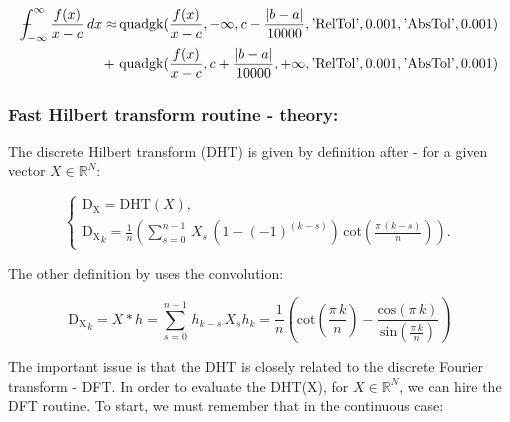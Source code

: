 \documentclass[12pt,twoside,a4paper]{article}
\numberwithin{equation}{subsection}
\numberwithin{figure}{subsection}
\def\Xint#1{\mathchoice
{\XXint\displaystyle\textstyle{#1}}%
{\XXint\textstyle\scriptstyle{#1}}%
{\XXint\scriptstyle\scriptscriptstyle{#1}}%
{\XXint\scriptscriptstyle\scriptscriptstyle{#1}}%
\!\int}
\def\XXint#1#2#3{{\setbox0=\hbox{$#1{#2#3}{\int}$ }\vcenter{\hbox{$#2#3$ }}\kern-.6\wd0}}
\def\dashint{\Xint-}
\begin{document}
\begin{alignat}{1} \label{eq:mat_quadadd}
  \dashint_{ - \infty }^{\infty } \frac {f(x)}{x-c} \, dx \approx 
          & \, \mathrm{quadgk}(\frac {f(x)}{x-c}, - \infty, c - \frac{|b-a|}{10000}, \text{'RelTol'}, 0.001, \text{'AbsTol'}, 0.001 ) \\
     + \, & \, \mathrm{quadgk}(\frac {f(x)}{x-c}, c + \frac{|b-a|}{10000}, + \infty, \text{'RelTol'}, 0.001, \text{'AbsTol'}, 0.001 )
     \nonumber
\end{alignat}
 
\subsubsection*{Fast Hilbert transform routine - theory:}

The discrete Hilbert transform (DHT) is given by definition after \cite{kak_multilayeredarray} - for a given vector $X \in \mathbb{R} ^ N$:

\begin{equation} \label{eq:matlab_fhttheroy}
	\begin{cases}
		\mathrm{D_X} = \mathrm{DHT}(X), \\
		\mathrm{D_X}_k = \frac {1}{n} 
			\left( 
				\sum_{s = 0}^{n - 1} \, X_s \, (1 - ( - 1)^{(k - s)})\,\mathrm{cot}(\frac {\pi \,(k - s) }{n}) 
			\right).
	\end{cases}
\end{equation}

The other definition by \cite{calvetti_computation} uses the convolution:

\begin{subequations} \label{eq:matlab_convolution}
	\begin{equation}   \label{eq:mconv_dht}
		\mathrm{D_X}_k = X * h = \sum_{s=0}^{n - 1}\,{h_{k - s}}\,{X_{s}}
	\end{equation}
	\begin{equation}   \label{eq:mconv_hk}
    	h_k = \frac{1}{n} 
    	\left(  
    		\mathrm{cot}(\frac {\pi \, k}{n}) - \frac{\mathrm{cos}(\pi \, k)}{\mathrm{sin}(\frac {\pi \, k}{n})}
		\right) 
	\end{equation}
\end{subequations}

The important issue is that the DHT is closely related to the discrete Fourier transform - DFT. In order to evaluate the DHT(X), for $X \in \mathbb{R} ^ N$, we can hire the DFT routine. To start, we must remember that in the continuous case:
\end{document}
